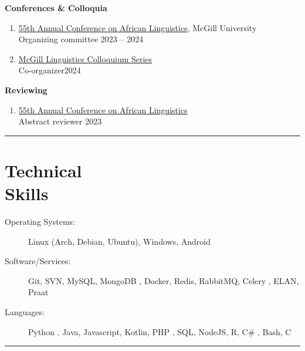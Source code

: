 \documentclass[margin,line]{resume}
\begin{document}
\begin{resume}
	\textbf{Conferences \& Colloquia}
	\begin{enumerate}[-, leftmargin=1em, topsep=4pt]
		\item[] \href{https://acal55.mull-lab.org/}{55th Annual Conference on African Linguistics}, McGill University\\
		      \hphantom{...}Organizing committee \hfill 2023 -- 2024

		\item[] \href{https://www.mcgill.ca/linguistics/events/colloquium-series}{McGill Linguistics Colloquium Series}\\
		      \hphantom{...}Co-organizer\hfill 2024
	\end{enumerate}

	\textbf{Reviewing}
	\begin{enumerate}[-, leftmargin=1em, topsep=4pt]
		\item[]  \href{https://acal55.mull-lab.org/}{55th Annual Conference on African Linguistics}\\
		      \hphantom{...}Abstract reviewer \hfill 2023
	\end{enumerate}

	\vspace{-1em}\rule{\textwidth}{0.4pt}


	\section{\mysidestyle Technical\\Skills}\vspace{2mm}
	\begin{description}
		\item[Operating Systems:] Linux (Arch, Debian, Ubuntu), Windows, Android
		\item[Software/Services:] Git, SVN, MySQL, MongoDB%
		      , Docker, Redis, RabbitMQ, Celery%
		      , ELAN, Praat%
		\item[Languages:] Python%
		      , Java, Javascript, Kotlin, PHP%
		      , SQL, NodeJS, R, C\#%
		      , Bash, C%
	\end{description}

	\vspace{-1.1em}\rule{\textwidth}{0.4pt}



\end{resume}
\end{document}
